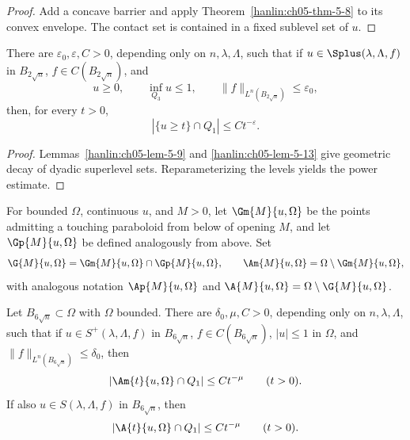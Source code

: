 \begin{proof}
\sketch Add a concave barrier and apply
Theorem~\ref{hanlin:ch05-thm-5-8} to its convex envelope. The contact set
is contained in a fixed sublevel set of $u$.
\end{proof}

\begin{lemma}\label{hanlin:ch05-lem-5-14}
There are $\varepsilon_0,\varepsilon,C>0$, depending only on
$n,\lambda,\Lambda$, such that if
$u\in\Splus(\lambda,\Lambda,f)$ in $B_{2\sqrt n}$,
$f\in C(B_{2\sqrt n})$, and
\[
u\geq0,\qquad \inf_{Q_3}u\leq1,\qquad
\|f\|_{L^n(B_{2\sqrt n})}\leq\varepsilon_0,
\]
then, for every $t>0$,
\[
|\{u\geq t\}\cap Q_1|\leq Ct^{-\varepsilon}.
\]
\end{lemma}

\begin{proof}
\sketch Lemmas~\ref{hanlin:ch05-lem-5-9} and
\ref{hanlin:ch05-lem-5-13} give geometric decay of dyadic superlevel sets.
Reparameterizing the levels yields the power estimate.
\end{proof}



For bounded $\Omega$, continuous $u$, and $M>0$, let
$\Gm{M}{u,\Omega}$ be the points admitting a touching paraboloid from
below of opening $M$, and let $\Gp{M}{u,\Omega}$ be defined analogously
from above. Set
\[
\G{M}{u,\Omega}=\Gm{M}{u,\Omega}\cap\Gp{M}{u,\Omega},
\qquad
\Am{M}{u,\Omega}=\Omega\setminus\Gm{M}{u,\Omega},
\]
with analogous notation $\Ap{M}{u,\Omega}$ and
$\A{M}{u,\Omega}=\Omega\setminus\G{M}{u,\Omega}$.

\begin{lemma}\label{hanlin:ch05-lem-5-15}
Let $B_{6\sqrt n}\subset\Omega$ with $\Omega$ bounded. There are
$\delta_0,\mu,C>0$, depending only on $n,\lambda,\Lambda$, such that if
$u\in S^+(\lambda,\Lambda,f)$ in $B_{6\sqrt n}$,
$f\in C(B_{6\sqrt n})$, $|u|\leq1$ in $\Omega$, and
$\|f\|_{L^n(B_{6\sqrt n})}\leq\delta_0$, then
\[
|\Am{t}{u,\Omega}\cap Q_1|\leq Ct^{-\mu}\qquad(t>0).
\]
If also $u\in S(\lambda,\Lambda,f)$ in $B_{6\sqrt n}$, then
\[
|\A{t}{u,\Omega}\cap Q_1|\leq Ct^{-\mu}\qquad(t>0).
\]
\end{lemma}

